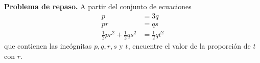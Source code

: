 \item \textbf{Problema de repaso.} A partir del conjunto de ecuaciones
\begin{align*}
    p &= 3q \\
    pr &= qs \\
    \frac{1}{2}pr^2 + \frac{1}{2}qs^2 &= \frac{1}{2}qt^2
\end{align*}
que contienen las incógnitas $p, q, r, s$ y $t$, encuentre el valor de la proporción de $t$ con $r$.
